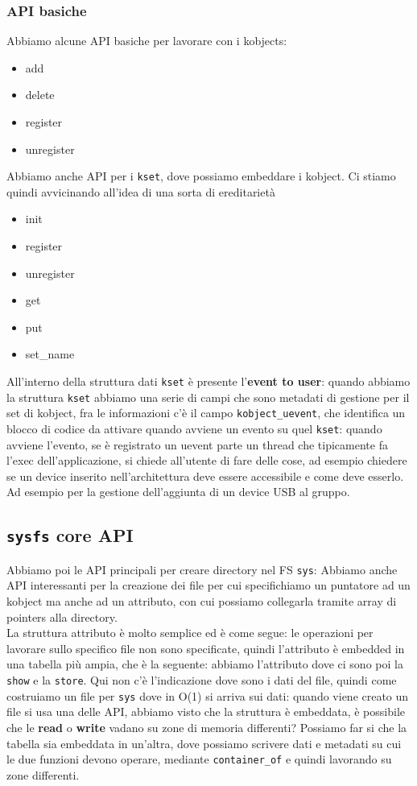 \documentclass[12pt, oneside]{extbook}
\begin{document}
\subsubsection{API basiche}
Abbiamo alcune API basiche per lavorare con i kobjects:
\begin{itemize}
	\item add
	\item delete
	\item register
	\item unregister
\end{itemize}
Abbiamo anche API per i \texttt{kset}, dove possiamo embeddare i kobject. Ci stiamo quindi avvicinando all'idea di una sorta di ereditarietà
\begin{itemize}
	\item init
	\item register
	\item unregister
	\item get
	\item put
	\item set\_name
\end{itemize}
All'interno della struttura dati \texttt{kset} è presente l'\textbf{event to user}: quando abbiamo la struttura \texttt{kset} abbiamo una serie di campi che sono metadati di gestione per il set di kobject, fra le informazioni c'è il campo \texttt{kobject\_uevent}, che identifica un blocco di codice da attivare quando avviene un evento su quel \texttt{kset}: quando avviene l'evento, se è registrato un uevent parte un thread che tipicamente fa l'exec dell'applicazione, si chiede all'utente di fare delle cose, ad esempio chiedere se un device inserito nell'architettura deve essere accessibile e come deve esserlo.\\Ad esempio per la gestione dell'aggiunta di un device USB al gruppo. 
\subsection{\texttt{sysfs} core API}
Abbiamo poi le API principali per creare directory nel FS \texttt{sys}:
Abbiamo anche API interessanti per la creazione dei file
per cui specifichiamo un puntatore ad un kobject ma anche ad un attributo, con cui possiamo collegarla tramite array di pointers alla directory.\\La struttura attributo è molto semplice ed è come segue:
le operazioni per lavorare sullo specifico file non sono specificate, quindi l'attributo è embedded in una tabella più ampia, che è la seguente:
abbiamo l'attributo dove ci sono poi la \texttt{show} e la \texttt{store}. Qui non c'è l'indicazione dove sono i dati del file, quindi come costruiamo un file per \texttt{sys} dove in O(1) si arriva sui dati: quando viene creato un file si usa una delle API, abbiamo visto che la struttura è embeddata, è possibile che le \textbf{read} o \textbf{write} vadano su zone di memoria differenti? Possiamo far si che la tabella sia embeddata in un'altra, dove possiamo scrivere dati e metadati su cui le due funzioni devono operare, mediante \texttt{container\_of} e quindi lavorando su zone differenti.
\end{document}
